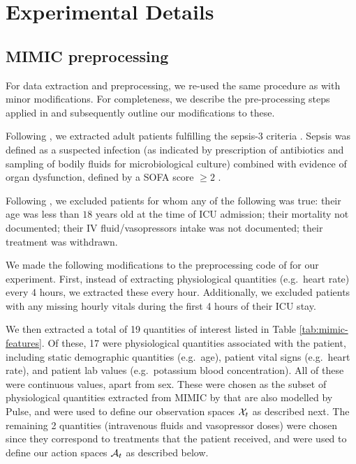 \section{Experimental Details} \label{sec:experiments-supplement}


\subsection{MIMIC preprocessing} \label{sec:mimic-preprocessing-supp}

For data extraction and preprocessing, we re-used the same procedure as \cite{ai-clinician} with minor modifications.
For completeness, we describe the pre-processing steps applied in \cite{ai-clinician} and subsequently outline our modifications to these.


Following \cite{ai-clinician}, we extracted adult patients fulfilling the sepsis-3 criteria \citep{sepsis-criteria}. 
Sepsis was defined as a suspected infection (as indicated by prescription of antibiotics and sampling of bodily fluids for microbiological culture) combined with evidence of organ dysfunction, defined by a SOFA score $\geq 2$ \citep{sepsis-criteria, seymour2016assessment}.  

Following \cite{ai-clinician}, we excluded patients for whom any of the following was true: their age was less than $18$ years old at the time of ICU admission; their mortality not documented; their IV fluid/vasopressors intake was not documented; their treatment was withdrawn.

We made the following modifications to the preprocessing code of \cite{ai-clinician} for our experiment.
First, instead of extracting physiological quantities (e.g.\ heart rate) every 4 hours, we extracted these every hour.
Additionally, we excluded patients with any missing hourly vitals during the first 4 hours of their ICU stay.

We then extracted a total of 19 quantities of interest listed in Table \ref{tab:mimic-features}.
Of these, 17 were physiological quantities associated with the patient, including static demographic quantities (e.g.\ age), patient vital signs (e.g.\ heart rate), and patient lab values (e.g.\ potassium blood concentration).
All of these were continuous values, apart from sex.
These were chosen as the subset of physiological quantities extracted from MIMIC by \cite{ai-clinician} that are also modelled by Pulse, and were used to define our observation spaces $\mathcal{X}_t$ as described next.
The remaining 2 quantities (intravenous fluids and vasopressor doses) were chosen since they correspond to treatments that the patient received, and were used to define our action spaces $\mathcal{A}_t$ as described below.

